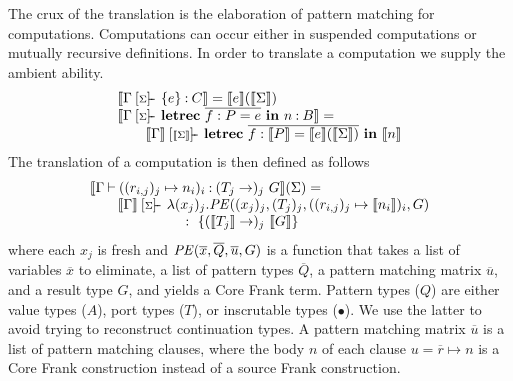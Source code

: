 \documentclass{sigplanconf}
\makeatletter
\newcommand{\many}{\overline}
\newcommand{\sem}[1]{\llbracket{#1}\rrbracket}
\newcommand\ba{\begin{array}}
\newcommand\ea{\end{array}}
\newcommand{\bl}{\ba[t]{@{}l@{}}}
\newcommand{\el}{\ea}
\newenvironment{syntax}{\[\ba{@{}l@{~}r@{~}c@{~}l@{}}}{\ea\]\ignorespacesafterend}
\newcommand{\sigentails}[1]{\mathbin{[{\text{\scriptsize ${#1}$}}]\!\text{-\!-}}\,}
\newcommand{\checkbase}[4]{#2 \mathbin{#1} #4 \mathbin{:} #3}
\newcommand{\has}[4]{\checkbase{\sigentails{#2}}{#1}{#3}{#4}}
\newcommand{\does}[3]{\checkbase{\vdash}{#1}{#2}{#3}}
\newcommand{\hasgs}{\has{\Gamma}{\sigs}}
\newcommand{\doesg}{\does{\Gamma}}
\newcommand{\checksgs}{\hasgs}
\newcommand{\checksdefg}{\doesg}
\newcommand{\sigs}{\Sigma}
\newcommand{\key}[1]{\mathbf{#1}} %
\newcommand{\thunk}[1]{\{{#1}\}}
\newcommand\slab[1]{(\textrm{#1})}
\makeatother
\begin{document}
The crux of the translation is the elaboration of pattern matching for
computations. Computations can occur either in suspended computations
or mutually recursive definitions. In order to translate a computation
we supply the ambient ability.
%
\[
\bl
\sem{\checksgs{C}{\thunk{e}}} = \sem{e}(\sem{\sigs}) \\
\sem{\checksgs{B}{\key{letrec}~\many{f : P = e}~\key{in}~n}} = \\
\qquad
  \sem{\Gamma} \sigentails{\sem{\sigs}} \key{letrec}~\many{f : \sem{P} = \sem{e}(\sem{\sigs})}~\key{in}~\sem{n} \\
\el
\]
The translation of a computation is then defined as follows
\[
\bl
\sem{\checksdefg{(T_j \to)_j~ G}{{((r_{i,j})_j \mapsto n_i)_i}}}(\sigs) = \\
\qquad
 \sem{\Gamma} \sigentails{\sigs}
   \bl
   \lambda (x_j)_j.
     \PE((x_j)_j, (T_j)_j, ((r_{i,j})_j \mapsto \sem{n_i})_i, G) \\
   \quad~:~\thunk{(\sem{T_j} \to)_j~ \sem{G}}
   \el \\
\el
\]
where each $x_j$ is fresh and $\PE(\many{x}, \many{Q}, \many{u}, G)$
is a function that takes a list of variables $\many{x}$ to eliminate,
a list of pattern types $\many{Q}$, a pattern matching matrix
$\many{u}$, and a result type $G$, and yields a Core Frank term.
%
Pattern types ($Q$) are either value types ($A$), port types ($T$), or
inscrutable types ($\bullet$). We use the latter to avoid trying to
reconstruct continuation types.
%
%
A pattern matching matrix $\many{u}$ is a list of pattern matching
clauses, where the body $n$ of each clause $u = \many{r} \mapsto n$ is
a Core Frank construction instead of a source Frank construction.
\end{document}
